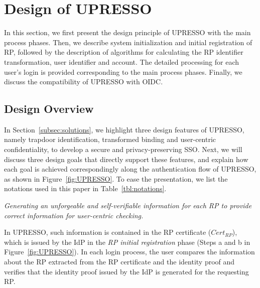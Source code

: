 \section{Design of UPRESSO}
\label{sec:UPRESSO}
In this section, we first present the design principle of UPRESSO with the main process phases. Then, we describe system initialization and initial registration of RP, followed by the description of algorithms for calculating the RP identifier transformation, user identifier and account. The detailed processing for each user's login is provided corresponding to the main process phases. Finally, we discuss the compatibility of UPRESSO with OIDC.

\subsection{Design Overview}
\label{subsec:overview}

In Section~\ref{subsec:solutions}, we highlight three design features of UPRESSO, namely trapdoor identification, transformed binding and user-centric confidentiality, to develop a secure and privacy-preserving SSO.
Next, we will discuss three design goals that directly support these features, and explain how each goal is achieved correspondingly along the authentication flow of UPRESSO, as shown in Figure~\ref{fig:UPRESSO}.
To ease the presentation, we list the notations used in this paper in Table~\ref{tbl:notations}.

\vspace{1mm} {\em Generating an unforgeable and self-verifiable information for each RP to provide correct information for user-centric checking.}

In UPRESSO, such information is contained in the RP certificate ($Cert_{RP}$), which is issued by the IdP in the \emph{RP initial registration} phase (Steps a and b in Figure~\ref{fig:UPRESSO}). In each login process, the user compares the information about the RP extracted from the RP certificate and the identity proof and verifies that the identity proof issued by the IdP is generated for the requesting RP.

